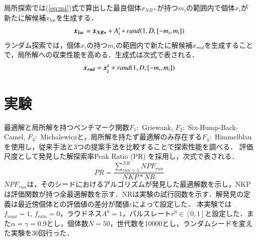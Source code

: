 \documentclass[twocolumn, a4paper]{UECIEresume}
\begin{document}
局所探索では(\ref{eq:mi})式で算出した最良個体$x_{NR*}$が持つ$m_i$の範囲内で個体$x_i$が新たに解候補$x_{loc}$を生成する．
\begin{equation}
\label{eq:dnrloc}
\mbox{\boldmath $x_{loc}$}=\mbox{\boldmath $x_{NR*}$} + A_i^t*rand(1,D,[-m_i, m_i])
\end{equation}
ランダム探索では，個体$x_i$の持つ$m_i$の範囲内で新たに解候補$x_{rnd}$を生成することで，局所解への収束性能を高める．生成式は次式で表される．
\begin{equation}
\label{eq:dnrrnd}
\mbox{\boldmath $x_{rnd}$}=\mbox{\boldmath $x_i^t$} + rand(1,D,[-m_i, m_i])
\end{equation}



\section{実験}
最適解と局所解を持つベンチマーク関数$F_1:$ Griewank, $F_2:$ Six-Hump-Back-Camel, $F_3:$ Michalewiczと，局所解を持たず最適解のみ存在する$F_4:$ Himmelblauを使用し，従来手法と3つの提案手法を比較することで探索性能を調べる．
評価尺度として発見した解探索率Peak Ratio (PR) \cite{CEC2013} を採用し，次式で表される．
\begin{equation}
\label{eq:PR}
PR=\frac{\sum_{run=1}^{NR}NPF_{run}}{NKP*NR}
\end{equation}
$NPF_{run}$は，そのシードにおけるアルゴリズムが発見した最適解数を示し，NKPは評価関数が持つ全最適解数を示す．NRは実験の試行回数を示す．解発見の定義は最近傍個体との評価値の差分が閾値$\varepsilon$によって設定した．
本実験では$f_{max}=1$, $f_{min}=0$，ラウドネス$A^0=1$，パルスレート$r^0 \in [0,1]$と設定した．また$\alpha= \gamma = 0.9$とし，個体数$N=50$，世代数を10000とし，ランダムシードを変えた実験を30回行った．
\end{document}
